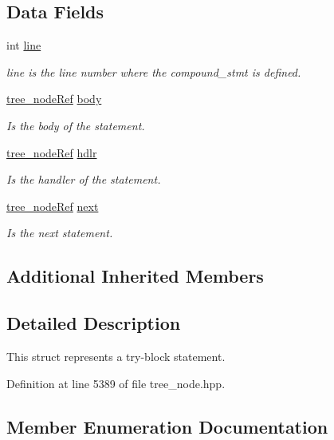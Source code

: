 \subsection*{Data Fields}
\begin{DoxyCompactItemize}
\item 
int \hyperlink{structtry__block_a49a4ee358822e743a7a74884fca99983}{line}
\begin{DoxyCompactList}\small\item\em line is the line number where the compound\+\_\+stmt is defined. \end{DoxyCompactList}\item 
\hyperlink{tree__node_8hpp_a6ee377554d1c4871ad66a337eaa67fd5}{tree\+\_\+node\+Ref} \hyperlink{structtry__block_a46c2521e8914c63ac3f8a3d032a8502c}{body}
\begin{DoxyCompactList}\small\item\em Is the body of the statement. \end{DoxyCompactList}\item 
\hyperlink{tree__node_8hpp_a6ee377554d1c4871ad66a337eaa67fd5}{tree\+\_\+node\+Ref} \hyperlink{structtry__block_a5c5b3ccaa1d2707f50daf00a33f693a6}{hdlr}
\begin{DoxyCompactList}\small\item\em Is the handler of the statement. \end{DoxyCompactList}\item 
\hyperlink{tree__node_8hpp_a6ee377554d1c4871ad66a337eaa67fd5}{tree\+\_\+node\+Ref} \hyperlink{structtry__block_aa9981dec15bc1cb7a1dcea4de0fceda6}{next}
\begin{DoxyCompactList}\small\item\em Is the next statement. \end{DoxyCompactList}\end{DoxyCompactItemize}
\subsection*{Additional Inherited Members}


\subsection{Detailed Description}
This struct represents a try-\/block statement. 

Definition at line 5389 of file tree\+\_\+node.\+hpp.



\subsection{Member Enumeration Documentation}
\mbox{\label{structtry__block_a372ca42e71bdce60bb4a6371cb8d8e8a}} 
